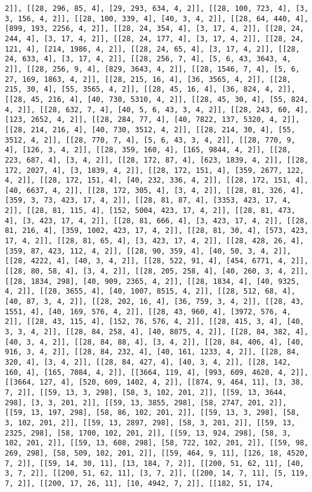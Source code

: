 \documentclass[12pt,fleqn]{article}\usepackage{../../common}
\begin{document}
\begin{verbatim}
2]], [[28, 296, 85, 4], [29, 293, 634, 4, 2]], [[28, 100, 723, 4], [3, 3, 156, 4, 2]], [[28, 100, 339, 4], [40, 3, 4, 2]], [[28, 64, 440, 4], [899, 193, 2256, 4, 2]], [[28, 24, 354, 4], [3, 17, 4, 2]], [[28, 24, 244, 4], [3, 17, 4, 2]], [[28, 24, 177, 4], [3, 17, 4, 2]], [[28, 24, 121, 4], [214, 1986, 4, 2]], [[28, 24, 65, 4], [3, 17, 4, 2]], [[28, 24, 633, 4], [3, 17, 4, 2]], [[28, 256, 7, 4], [5, 6, 43, 3643, 4, 2]], [[28, 256, 9, 4], [829, 3643, 4, 2]], [[28, 1546, 7, 4], [5, 6, 27, 169, 1863, 4, 2]], [[28, 215, 16, 4], [36, 3565, 4, 2]], [[28, 215, 30, 4], [55, 3565, 4, 2]], [[28, 45, 16, 4], [36, 824, 4, 2]], [[28, 45, 216, 4], [40, 730, 5310, 4, 2]], [[28, 45, 30, 4], [55, 824, 4, 2]], [[28, 632, 7, 4], [40, 5, 6, 43, 3, 4, 2]], [[28, 243, 60, 4], [123, 2652, 4, 2]], [[28, 284, 77, 4], [40, 7822, 137, 5320, 4, 2]], [[28, 214, 216, 4], [40, 730, 3512, 4, 2]], [[28, 214, 30, 4], [55, 3512, 4, 2]], [[28, 770, 7, 4], [5, 6, 43, 3, 4, 2]], [[28, 770, 9, 4], [126, 3, 4, 2]], [[28, 359, 160, 4], [165, 9844, 4, 2]], [[28, 223, 687, 4], [3, 4, 2]], [[28, 172, 87, 4], [623, 1839, 4, 2]], [[28, 172, 2027, 4], [3, 1839, 4, 2]], [[28, 172, 151, 4], [359, 2677, 122, 4, 2]], [[28, 172, 151, 4], [40, 232, 336, 4, 2]], [[28, 172, 151, 4], [40, 6637, 4, 2]], [[28, 172, 305, 4], [3, 4, 2]], [[28, 81, 326, 4], [359, 3, 73, 423, 17, 4, 2]], [[28, 81, 87, 4], [3353, 423, 17, 4, 2]], [[28, 81, 115, 4], [152, 5004, 423, 17, 4, 2]], [[28, 81, 473, 4], [3, 423, 17, 4, 2]], [[28, 81, 666, 4], [3, 423, 17, 4, 2]], [[28, 81, 216, 4], [359, 1002, 423, 17, 4, 2]], [[28, 81, 30, 4], [573, 423, 17, 4, 2]], [[28, 81, 65, 4], [3, 423, 17, 4, 2]], [[28, 428, 26, 4], [359, 87, 423, 112, 4, 2]], [[28, 90, 359, 4], [40, 50, 3, 4, 2]], [[28, 4222, 4], [40, 3, 4, 2]], [[28, 522, 91, 4], [454, 6771, 4, 2]], [[28, 80, 58, 4], [3, 4, 2]], [[28, 205, 258, 4], [40, 260, 3, 4, 2]], [[28, 1834, 298], [40, 909, 2365, 4, 2]], [[28, 1834, 4], [40, 9325, 4, 2]], [[28, 3655, 4], [40, 1007, 8515, 4, 2]], [[28, 512, 68, 4], [40, 87, 3, 4, 2]], [[28, 202, 16, 4], [36, 759, 3, 4, 2]], [[28, 43, 1551, 4], [40, 169, 576, 4, 2]], [[28, 43, 960, 4], [3972, 576, 4, 2]], [[28, 43, 115, 4], [152, 76, 576, 4, 2]], [[28, 415, 3, 4], [40, 3, 3, 4, 2]], [[28, 84, 258, 4], [40, 8075, 4, 2]], [[28, 84, 382, 4], [40, 3, 4, 2]], [[28, 84, 88, 4], [3, 4, 2]], [[28, 84, 406, 4], [40, 916, 3, 4, 2]], [[28, 84, 232, 4], [40, 161, 1233, 4, 2]], [[28, 84, 320, 4], [3, 4, 2]], [[28, 84, 427, 4], [40, 3, 4, 2]], [[28, 142, 160, 4], [165, 7084, 4, 2]], [[3664, 119, 4], [993, 609, 4620, 4, 2]], [[3664, 127, 4], [520, 609, 1402, 4, 2]], [[874, 9, 464, 11], [3, 38, 7, 2]], [[59, 13, 3, 298], [58, 3, 102, 201, 2]], [[59, 13, 3644, 298], [3, 3, 201, 2]], [[59, 13, 3855, 298], [58, 2747, 201, 2]], [[59, 13, 197, 298], [58, 86, 102, 201, 2]], [[59, 13, 3, 298], [58, 3, 102, 201, 2]], [[59, 13, 2897, 298], [58, 3, 201, 2]], [[59, 13, 2325, 298], [58, 1700, 102, 201, 2]], [[59, 13, 924, 298], [58, 3, 102, 201, 2]], [[59, 13, 608, 298], [58, 722, 102, 201, 2]], [[59, 98, 269, 298], [58, 509, 102, 201, 2]], [[59, 464, 9, 11], [126, 18, 4520, 7, 2]], [[59, 14, 30, 11], [13, 184, 7, 2]], [[200, 51, 62, 11], [40, 3, 7, 2]], [[200, 51, 62, 11], [3, 7, 2]], [[200, 14, 7, 11], [5, 119, 7, 2]], [[200, 17, 26, 11], [10, 4942, 7, 2]], [[182, 51, 174, 
\end{verbatim}
\end{document}
